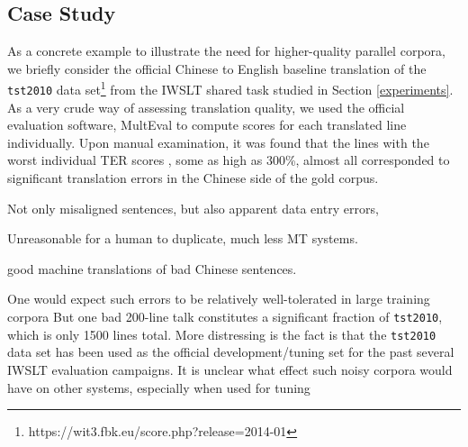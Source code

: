 \subsection{Case Study}
\label{case_study}

As a concrete example to illustrate the need for higher-quality parallel corpora, we briefly consider the official Chinese to English baseline translation of the {\small \tt tst2010} data set\footnote{https://wit3.fbk.eu/score.php?release=2014-01} from the IWSLT shared task studied in Section \ref{experiments}.
As a very crude way of assessing translation quality, we used the official evaluation software, MultEval  to compute scores for each translated line individually.
Upon manual examination, it was found that the lines with the worst individual TER scores , some as high as 300\%, almost all corresponded to significant translation errors in the Chinese side of the gold corpus.

Not only misaligned sentences, but also apparent data entry errors, 

Unreasonable for a human to duplicate, much less MT systems.




good machine translations of bad Chinese sentences.






One would expect such errors to be relatively well-tolerated in large training corpora
But one bad 200-line talk constitutes a significant fraction of {\small \tt tst2010}, which is only 1500 lines total.
More distressing is the fact is that the {\small \tt tst2010} data set has been used as the official development/tuning set for the past several IWSLT evaluation campaigns.
It is unclear what effect such noisy corpora would have on other systems, 
especially when used for tuning



